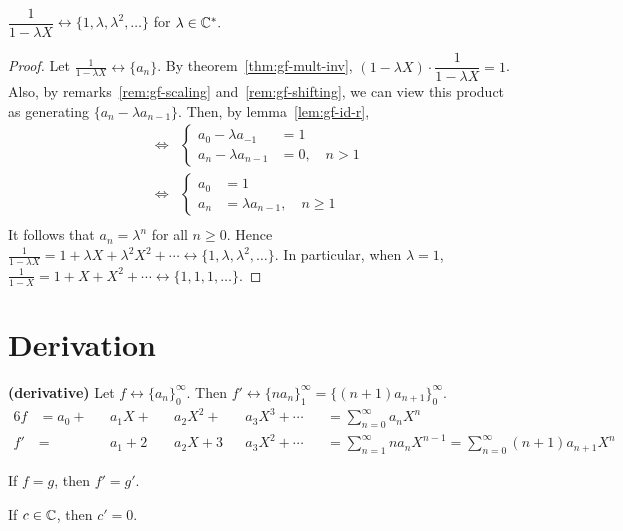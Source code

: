 \documentclass[a4paper, 12pt]{report}
\begin{document}
\begin{cor}\label{cor:gf-1-lambda_X}
$\dfrac{1}{1 - \lambda X} \longleftrightarrow \{1, \lambda, \lambda^2, \dots\}$ for $\lambda \in \mathbb{C}^*.$
\end{cor}
\begin{proof}
Let $\frac{1}{1 - \lambda X} \longleftrightarrow \{a_n\}$.
By theorem~\ref{thm:gf-mult-inv}, $(1 - \lambda X) \cdot \dfrac{1}{1 - \lambda X} = 1$. Also, by remarks~\ref{rem:gf-scaling} and~\ref{rem:gf-shifting}, we can view this product as generating $\{a_n - \lambda a_{n - 1}\}$. Then, by lemma~\ref{lem:gf-id-r},
\begin{align*}
    \iff &\begin{cases}
    a_0 - \lambda a_{-1} &= 1\\
    a_n - \lambda a_{n - 1} &= 0, \quad n > 1
    \end{cases}\\
    \iff &\begin{cases}
    a_0 &= 1\\
    a_n &= \lambda a_{n - 1}, \quad n \geq 1
    \end{cases}\\
\end{align*}
It follows that $a_n = \lambda^n$ for all $n \geq 0$. Hence $\frac{1}{1 - \lambda X} = 1 + \lambda X + \lambda^2 X^2 + \cdots \longleftrightarrow \{1, \lambda, \lambda^2, \dots\}$. In particular, when $\lambda = 1$, $\frac{1}{1 - X} = 1 + X + X^2 + \cdots \longleftrightarrow \{1, 1, 1, \dots\}$.
\end{proof}

\section{Derivation}
\begin{defn}\label{def:gf-deriv}
\textbf{(derivative)} Let $f \longleftrightarrow \{a_n\}_0^\infty$. Then $f' \longleftrightarrow \{n a_n\}_1^\infty = \{(n + 1) a_{n + 1}\}_0^\infty$.
\begin{alignat*}{6}
    f &= a_0 + &&a_1 X + &&a_2 X^2 + &&a_3 X^3 + \cdots &&= \sum_{n = 0}^\infty a_n X^n\\
    f'&=       &&a_1 + 2 &&a_2 X + 3 &&a_3 X^2 + \cdots &&= \sum_{n = 1}^\infty n a_n X^{n - 1} = \sum_{n = 0}^\infty (n + 1) a_{n + 1} X^{n}
\end{alignat*}
\end{defn}
\begin{rem}\label{rem:gf-eq-deriv-eq}
If $f = g$, then $f' = g'$.
\end{rem}
\begin{rem}\label{rem:gf-constant-deriv}
If $c \in \mathbb{C}$, then $c' = 0$.
\end{rem}
\end{document}
